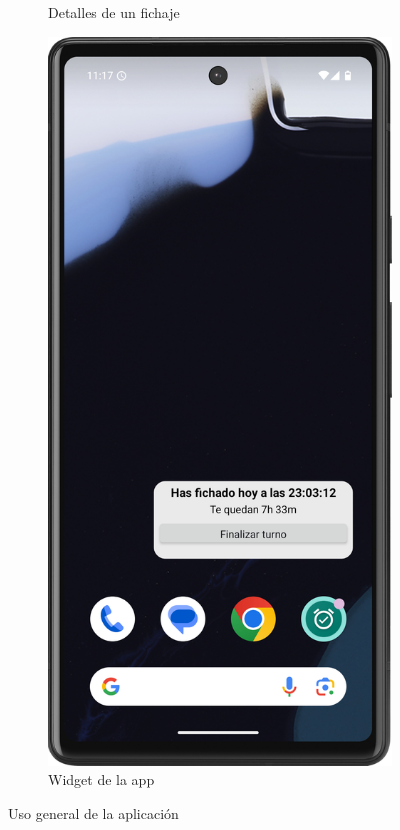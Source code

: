 \begin{figure}[H]
\begin{subfigure}[b]{0.22\textwidth}
         \caption{Detalles de un fichaje}
         \label{fig:detalles}
     \end{subfigure}
     \hfill
     \begin{subfigure}[b]{0.22\textwidth}
         \centering
         \includegraphics[width=\textwidth]{root/widget.png}
         \caption{Widget de la app}
         \label{fig:widget}
     \end{subfigure}
        \caption{Uso general de la aplicación}
        \label{fig:uso}
\end{figure}

